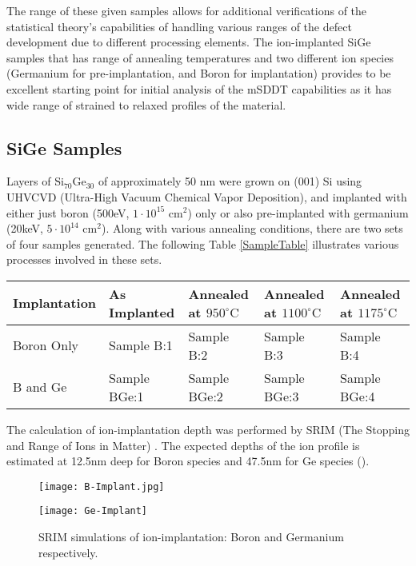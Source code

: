  The range of these given samples allows for additional verifications of the statistical theory's capabilities of handling various ranges of the defect development due to different processing elements.  The ion-implanted SiGe samples that has range of annealing temperatures and two different ion species (Germanium for pre-implantation, and Boron for implantation) provides to be excellent starting point for initial analysis of the mSDDT capabilities as it has wide range of strained to relaxed profiles of the material.


\subsection{SiGe Samples}

Layers of Si$_{70}$Ge$_{30}$ of approximately 50 nm were grown on (001) Si using UHVCVD (Ultra-High Vacuum Chemical Vapor Deposition), and implanted with either just boron (500eV, $1\cdot 10^{15}$ cm$^2$) only or also pre-implanted with germanium (20keV, $5\cdot 10^{14}$ cm$^2$).  Along with various annealing conditions, there are two sets of four samples generated.  The following Table \ref{SampleTable} illustrates various processes involved in these sets.

\begin{table*}[ht]
  \caption{Processing of the SiGe sample sets}
  \begin{tabular}[htbp]{@{}l|llll@{}}
    \hline
   Implantation & As Implanted & Annealed at $950^{\circ}\mathrm{C}$ & Annealed at $1100^{\circ}\mathrm{C}$ & Annealed at $1175^{\circ}\mathrm{C}$ \\
    \hline
   Boron Only & Sample B:1 & Sample B:2  & Sample B:3 & Sample B:4  \\
   B and Ge & Sample BGe:1 & Sample BGe:2  & Sample BGe:3 & Sample BGe:4  \\
    \hline
  \end{tabular}
  \label{SampleTable}
\end{table*}

The calculation of ion-implantation depth was performed by SRIM (The Stopping and Range of Ions in Matter) \cite{SRIM}.  The expected depths of the ion profile is estimated at 12.5nm deep for Boron species and 47.5nm for Ge species ().
\begin{figure}
\caption{SRIM simulations of ion-implantation:  Boron and Germanium respectively.}
\label{SRIM}
\begin{minipage}{0.5\linewidth}\texttt{[image: B-Implant.jpg]}\end{minipage}\begin{minipage}{0.5\linewidth}
\texttt{[image: Ge-Implant]}\end{minipage}\end{figure}


